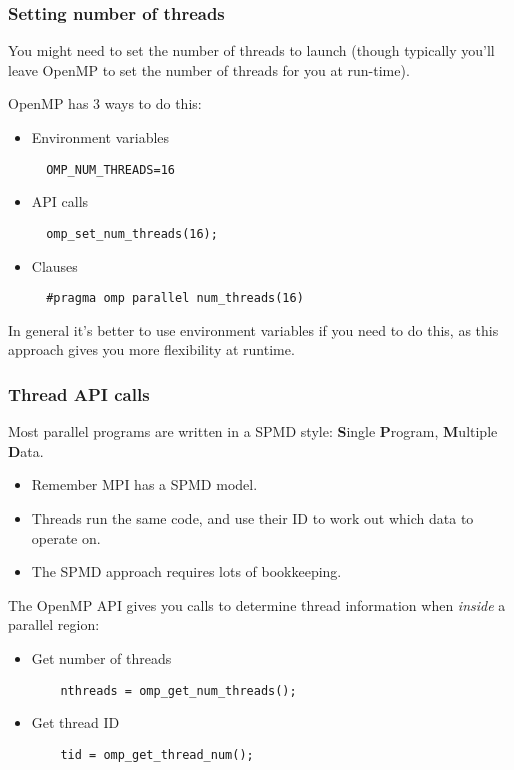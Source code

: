 \documentclass{beamer}
\begin{document}
\begin{frame}[fragile]
\frametitle{Setting number of threads}
You might need to set the number of threads to launch (though typically you'll leave OpenMP to set the number of threads for you at run-time).

OpenMP has 3 ways to do this:
\begin{itemize}
  \item Environment variables
  \begin{verbatim}
  OMP_NUM_THREADS=16
  \end{verbatim}

  \item API calls
  \begin{verbatim}
  omp_set_num_threads(16);
  \end{verbatim}

  \item Clauses
  \begin{verbatim}
  #pragma omp parallel num_threads(16)
  \end{verbatim}
\end{itemize}

In general it's better to use environment variables if you need to do this, as this approach gives you more flexibility at runtime.
\end{frame}

\begin{frame}[fragile]
\frametitle{Thread API calls}
Most parallel programs are written in a SPMD style: \newline
{\bf S}ingle {\bf P}rogram, {\bf M}ultiple {\bf D}ata.
\begin{itemize}
  \item Remember MPI has a SPMD model.
  \item Threads run the same code, and use their ID to work out which data to operate on.
  \item The SPMD approach requires lots of bookkeeping.
\end{itemize}

The OpenMP API gives you calls to determine thread information when \emph{inside} a parallel region:
\begin{itemize}
  \item Get number of threads
    \begin{verbatim}
    nthreads = omp_get_num_threads();
    \end{verbatim}

  \item Get thread ID
    \begin{verbatim}
    tid = omp_get_thread_num();
    \end{verbatim}

\end{itemize}
\end{frame}
\end{document}
